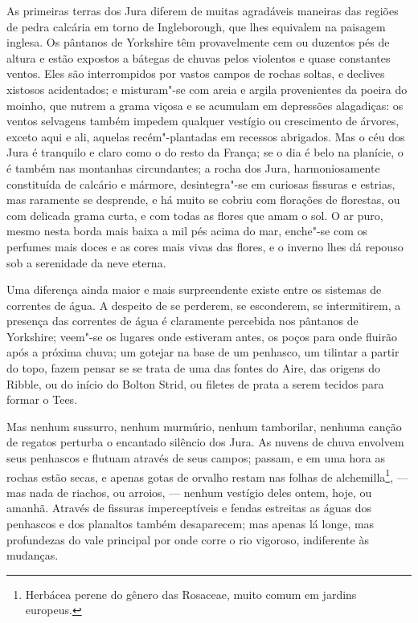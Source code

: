 As primeiras terras dos Jura diferem de muitas agradáveis maneiras
das regiões de pedra calcária em torno de Ingleborough, que lhes
equivalem na paisagem inglesa. Os pântanos de Yorkshire têm
provavelmente cem ou duzentos pés de altura e estão expostos a bátegas
de chuvas pelos violentos e quase constantes ventos. Eles são
interrompidos por vastos campos de rochas soltas, e declives xistosos
acidentados; e misturam"-se com areia e argila provenientes da poeira do
moinho, que nutrem a grama viçosa e se acumulam em depressões
alagadiças: os ventos selvagens também impedem qualquer vestígio ou
crescimento de árvores, exceto aqui e ali, aquelas recém"-plantadas em
recessos abrigados. Mas o céu dos Jura é tranquilo e claro como o do
resto da França; se o dia é belo na planície, o é também nas montanhas
circundantes; a rocha dos Jura, harmoniosamente constituída de calcário
e mármore, desintegra"-se em curiosas fissuras e estrias, mas raramente
se desprende, e há muito se cobriu com florações de florestas, ou com
delicada grama curta, e com todas as flores que amam o sol. O ar puro,
mesmo nesta borda mais baixa a mil pés acima do mar, enche"-se com os
perfumes mais doces e as cores mais vivas das flores, e o inverno lhes
dá repouso sob a serenidade da neve eterna.

Uma diferença ainda maior e mais surpreendente existe entre os
sistemas de correntes de água. A despeito de se perderem, se esconderem,
se intermitirem, a presença das correntes de água é claramente percebida
nos pântanos de Yorkshire; veem"-se os lugares onde estiveram antes, os
poços para onde fluirão após a próxima chuva; um gotejar na base de um
penhasco, um tilintar a partir do topo, fazem pensar se se trata de uma
das fontes do Aire, das origens do Ribble, ou do início do Bolton Strid,
ou filetes de prata a serem tecidos para formar o Tees.

Mas nenhum sussurro, nenhum murmúrio, nenhum tamborilar, nenhuma canção
de regatos perturba o encantado silêncio dos Jura. As nuvens de chuva
envolvem seus penhascos e flutuam através de seus campos; passam, e em
uma hora as rochas estão secas, e apenas gotas de orvalho restam nas
folhas de alchemilla\footnote{Herbácea perene do gênero das Rosaceae,
  muito comum em jardins europeus.}, --- mas nada de
riachos, ou arroios, --- nenhum vestígio deles ontem, hoje, ou amanhã.
Através de fissuras imperceptíveis e fendas estreitas as águas dos
penhascos e dos planaltos também desaparecem; mas apenas lá longe, mas
profundezas do vale principal por onde corre o rio vigoroso, indiferente
às mudanças.

